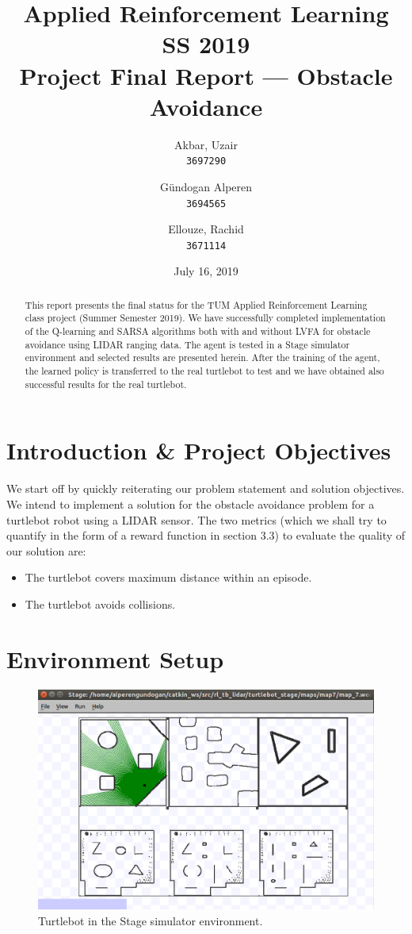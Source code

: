 \documentclass{article}
\title{Applied Reinforcement Learning\\
        \vspace{-0.25cm}
        {\large SS 2019}\\
        \vspace{0.25cm}
        {Project Final Report --- Obstacle Avoidance}}
\author{
  \small Akbar, Uzair\\
  \small \texttt{3697290}
  \and
  \small G\"undogan Alperen\\
  \small \texttt{3694565}
  \and
  \small Ellouze, Rachid \\
  \small \texttt{3671114}
}
\date{July 16, 2019}
\begin{document}
\begin{titlingpage}
    \maketitle
    \begin{abstract}
This report presents the final status for the TUM Applied Reinforcement Learning class project (Summer Semester 2019). We have successfully completed implementation of the Q-learning and SARSA algorithms both with and without LVFA for obstacle avoidance using LIDAR ranging data. The agent is tested in a Stage simulator environment and selected results are presented herein. After the training of the agent, the learned policy is transferred to the real turtlebot to test and we have obtained also successful results for the real turtlebot.
    \end{abstract}
    \tableofcontents
\end{titlingpage}

\section{Introduction \& Project Objectives}
We start off by quickly reiterating our problem statement and solution objectives. We intend to implement a solution for the obstacle avoidance problem for a turtlebot robot using a LIDAR sensor. The two metrics (which we shall try to quantify in the form of a reward function in section 3.3) to evaluate the quality of our solution are:
\begin{itemize}
\item The turtlebot covers maximum distance within an episode.
\item The turtlebot avoids collisions.
\end{itemize}

\section{Environment Setup}
\begin{figure}[ht]
 \centering
 \includegraphics[width=.8\textwidth]{stage.png}
  \caption{Turtlebot in the Stage simulator environment.}
  \label{fig:stage}
\end{figure}
\end{document}
